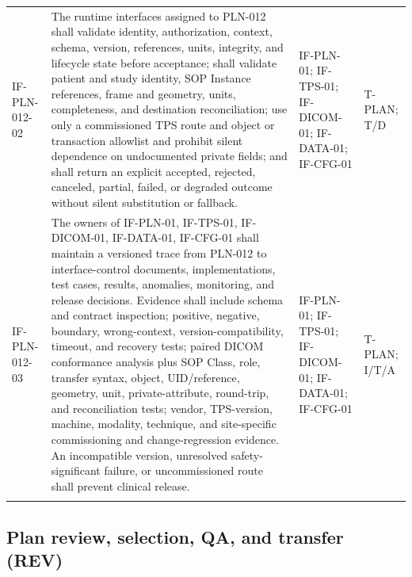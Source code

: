 \documentclass[11pt,letterpaper]{article}
\begin{document}
\begin{scriptsize}
\begin{longtable}{@{}L{0.14\textwidth}L{0.49\textwidth}L{0.19\textwidth}L{0.10\textwidth}@{}}
\addlinespace[2pt]
\mbox{IF-PLN-012-02} & The runtime interfaces assigned to PLN-012 shall validate identity, authorization, context, schema, version, references, units, integrity, and lifecycle state before acceptance; shall validate patient and study identity, SOP Instance references, frame and geometry, units, completeness, and destination reconciliation; use only a commissioned TPS route and object or transaction allowlist and prohibit silent dependence on undocumented private fields; and shall return an explicit accepted, rejected, canceled, partial, failed, or degraded outcome without silent substitution or fallback. & IF-PLN-01; IF-TPS-01; IF-DICOM-01; IF-DATA-01; IF-CFG-01 & T-PLAN; T\slash\allowbreak{}D \\
\addlinespace[2pt]
\mbox{IF-PLN-012-03} & The owners of IF-PLN-01, IF-TPS-01, IF-DICOM-01, IF-DATA-01, IF-CFG-01 shall maintain a versioned trace from PLN-012 to interface-control documents, implementations, test cases, results, anomalies, monitoring, and release decisions. Evidence shall include schema and contract inspection; positive, negative, boundary, wrong-context, version-compatibility, timeout, and recovery tests; paired DICOM conformance analysis plus SOP Class, role, transfer syntax, object, UID\slash\allowbreak{}reference, geometry, unit, private-attribute, round-trip, and reconciliation tests; vendor, TPS-version, machine, modality, technique, and site-specific commissioning and change-regression evidence. An incompatible version, unresolved safety-significant failure, or uncommissioned route shall prevent clinical release. & IF-PLN-01; IF-TPS-01; IF-DICOM-01; IF-DATA-01; IF-CFG-01 & T-PLAN; I\slash\allowbreak{}T\slash\allowbreak{}A \\
\addlinespace[2pt]
\end{longtable}
\end{scriptsize}

\subsection{Plan review, selection, QA, and transfer (REV)}
\end{document}
